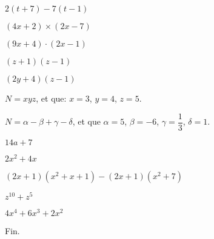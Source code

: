 \documentclass[a4paper,12pt]{scrartcl}
\begin{document}
\question{}
$2(t + 7)-7(t - 1)$


\question{}
$(4x+2) \times (2x-7)$

\question{}
$(9x+4) \cdot (2x-1)$

\question{}
$(z+1)(z-1)$

\question{}
$(2y+4)(z-1)$


\question{}
$N = xyz$, et que: $x=3$, $y=4$, $z=5$.

\question{}
$N = \alpha - \beta + \gamma - \delta$, et que $\alpha = 5$, $\beta = -6$, $\gamma = \dfrac{1}{3}$, $\delta = 1$.


\question{}
$14a + 7$

\question{}
$2x^2 + 4x$

\question{}
$(2x+1)(x^2 + x + 1) - (2x+1)(x^2 + 7)$

\question{}
$z^{10} + z^5$

\question{}
$4x^4 + 6x^3 + 2x^2$

\trait

\begin{center}
Fin.
\end{center}
\end{document}
